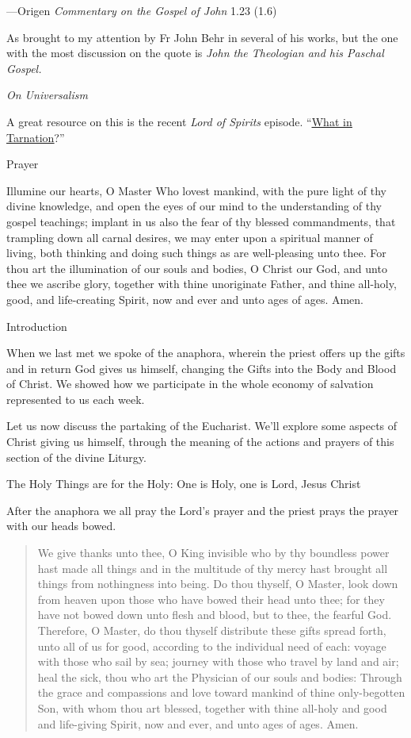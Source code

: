 \documentclass[
]{article}
\begin{document}
---Origen \emph{Commentary on the Gospel of John} 1.23 (1.6)

As brought to my attention by Fr John Behr in several of his works, but
the one with the most discussion on the quote is \emph{John the
Theologian and his Paschal Gospel.}

\emph{On Universalism}

A great resource on this is the recent \emph{Lord of Spirits} episode.
``\href{https://www.ancientfaith.com/podcasts/lordofspirits/what_in_tarnation}{\ul{What
in Tarnation}}?''

Prayer

Illumine our hearts, O Master Who lovest mankind, with the pure light of
thy divine knowledge, and open the eyes of our mind to the understanding
of thy gospel teachings; implant in us also the fear of thy blessed
commandments, that trampling down all carnal desires, we may enter upon
a spiritual manner of living, both thinking and doing such things as are
well-pleasing unto thee. For thou art the illumination of our souls and
bodies, O Christ our God, and unto thee we ascribe glory, together with
thine unoriginate Father, and thine all-holy, good, and life-creating
Spirit, now and ever and unto ages of ages. Amen.

Introduction

When we last met we spoke of the anaphora, wherein the priest offers up
the gifts and in return God gives us himself, changing the Gifts into
the Body and Blood of Christ. We showed how we participate in the whole
economy of salvation represented to us each week.

Let us now discuss the partaking of the Eucharist. We'll explore some
aspects of Christ giving us himself, through the meaning of the actions
and prayers of this section of the divine Liturgy.

The Holy Things are for the Holy: One is Holy, one is Lord, Jesus Christ

After the anaphora we all pray the Lord's prayer and the priest prays
the prayer with our heads bowed.

\begin{quote}
We give thanks unto thee, O King invisible who by thy boundless power
hast made all things and in the multitude of thy mercy hast brought all
things from nothingness into being. Do thou thyself, O Master, look down
from heaven upon those who have bowed their head unto thee; for they
have not bowed down unto flesh and blood, but to thee, the fearful God.
Therefore, O Master, do thou thyself distribute these gifts spread
forth, unto all of us for good, according to the individual need of
each: voyage with those who sail by sea; journey with those who travel
by land and air; heal the sick, thou who art the Physician of our souls
and bodies: Through the grace and compassions and love toward mankind of
thine only-begotten Son, with whom thou art blessed, together with thine
all-holy and good and life-giving Spirit, now and ever, and unto ages of
ages. Amen.
\end{quote}
\end{document}
